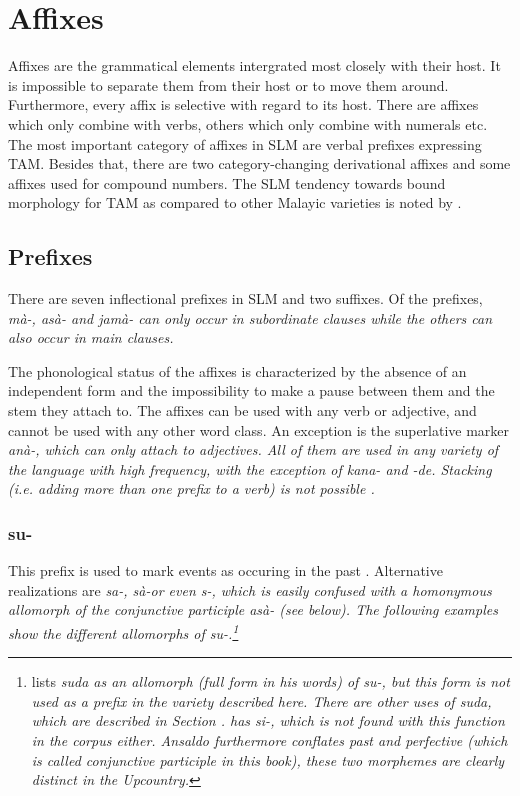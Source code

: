 \section{Affixes}\label{sec:morph:Affixes}
Affixes are the grammatical elements intergrated most closely with their host. It is impossible to separate them from their host or to move them around. Furthermore, every affix is selective with regard to its host. There are affixes which only combine with verbs, others which only combine  with numerals etc.
The most important category of affixes in SLM are verbal prefixes expressing TAM. Besides that, there are two category-changing derivational affixes and some affixes used for compound numbers.   
The SLM tendency towards bound morphology for TAM  as compared to other Malayic varieties is noted by \citet{Ansaldo2005ms}.

\subsection{Prefixes}\label{sec:morph:Verbalprefixes}
There are seven  inflectional prefixes in SLM and two suffixes. Of the prefixes,  \em mà-, asà- \em and \em jamà- \em can only occur in subordinate clauses while the others can also occur in main clauses.

The phonological status of the affixes is characterized by the absence of an independent form and the impossibility to make a pause between them and the stem they attach to. The affixes can be used with any verb or adjective, and cannot be used with any other word class. An exception is the superlative marker \em anà-\em, which can only attach to adjectives. All of them are used in any variety of the language with high frequency, with the exception of \em kana- \em and \em -de\em. Stacking (i.e. adding more than one prefix to a verb) is not possible \citep[cf.][144]{Slomanson2007cll}.


\subsubsection{su-}\label{sec:morph:su-}
This prefix is used to mark events as occuring in the past \citep[166]{SmithEtAl2007}. Alternative realizations are \em sa-, sà-\em or even \em s-\em, which is easily confused with a homonymous allomorph of the conjunctive participle  \em asà- \em (see below)\citep[cf.][137]{Slomanson2007cll}. The following examples show the different allomorphs of \em su-\em.\footnote{\citet[31]{Adelaar1991} lists \em suda \em as an allomorph (full form in his words) of \em su-\em, but this form is not used as a prefix in the variety described here. There are other uses of \em suda\em, which are described in Section . \citet{Ansaldo2009} has \em si-\em, which is not found with this function in the corpus either. Ansaldo furthermore conflates past and perfective (which is called conjunctive participle in this book), these two morphemes are clearly distinct in the Upcountry.}

